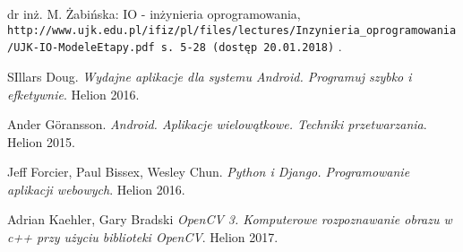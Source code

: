 \newpage
   \begin{thebibliography}{99}
   
    	dr inż. M. Żabińska: IO - inżynieria oprogramowania,
    	\\\texttt{http://www.ujk.edu.pl/ifiz/pl/files/lectures/Inzynieria_oprogramowania/UJK-IO-ModeleEtapy.pdf s. 5-28 (dostęp 20.01.2018)}
		.
		
    	SIllars Doug.
    	\textit{Wydajne aplikacje dla systemu Android. Programuj szybko i efketywnie}. 
    	Helion 2016.
    	
    	
    	Ander Göransson. 
    	\textit{Android. Aplikacje wielowątkowe. Techniki przetwarzania}. 
    	Helion 2015.
    	
    	
    	Jeff Forcier, Paul Bissex, Wesley Chun.
    	\textit{Python i Django. Programowanie aplikacji webowych}. 
    	Helion 2016.
    	
    	
    	Adrian Kaehler, Gary Bradski 
    	\textit{OpenCV 3. Komputerowe rozpoznawanie obrazu w c++ przy użyciu biblioteki OpenCV}. 
    	Helion 2017.
   
	 \end{thebibliography}
 

